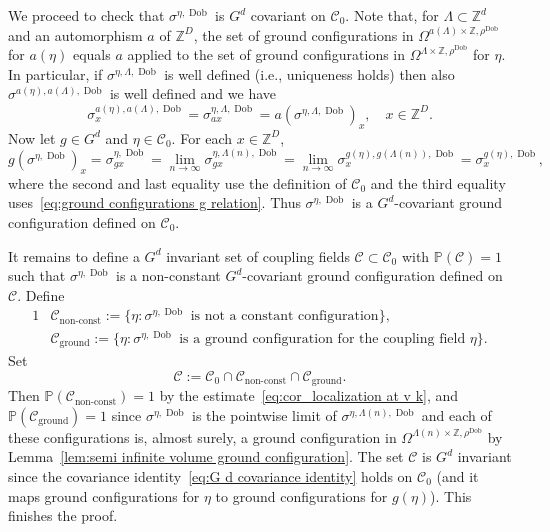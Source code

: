 \documentclass[11pt, reqno]{amsart}
\newcommand{\Z}{\mathbb{Z}}
\DeclareMathOperator{\Dob}{Dob}
\renewcommand{\P}{\mathbb{P}}
\numberwithin{equation}{section}
\begin{document}
We proceed to check that $\sigma^{\eta,\Dob}$ is $G^d$ covariant on $\mathcal{C}_0$. Note that, for $\Lambda\subset\Z^d$ and an automorphism $a$ of $\Z^D$, the set of ground configurations in $\Omega^{a(\Lambda)\times\Z,\rho^{\Dob}}$ for $a(\eta)$ equals $a$ applied to the set of ground configurations in $\Omega^{\Lambda\times\Z,\rho^{\Dob}}$ for $\eta$. In particular, if $\sigma^{\eta,\Lambda,\Dob}$ is well defined (i.e., uniqueness holds) then also $\sigma^{a(\eta),a(\Lambda),\Dob}$ is well defined and we have
\begin{equation}
\label{eq:ground configurations g relation}\sigma^{a(\eta),a(\Lambda),\Dob}_x=\sigma^{\eta,\Lambda,\Dob}_{a x} = a(\sigma^{\eta,\Lambda,\Dob})_x,\quad x\in\Z^D.
\end{equation} 
Now let $g\in G^d$ and $\eta\in\mathcal{C}_0$. For each $x\in\Z^D$,
\begin{equation}\label{eq:G d covariance identity}
g(\sigma^{\eta,\Dob})_x = \sigma^{\eta,\Dob}_{g x} = \lim_{n\to\infty}\sigma^{\eta,\Lambda(n),\Dob}_{g x}=\lim_{n\to\infty}\sigma^{g(\eta),g(\Lambda(n)),\Dob}_x = \sigma^{g(\eta),\Dob}_x,
\end{equation}
where the second and last equality use the definition of $\mathcal{C}_0$ and the third equality uses~\eqref{eq:ground configurations g relation}. Thus $\sigma^{\eta,\Dob}$ is a $G^d$-covariant ground configuration defined on $\mathcal{C}_0$.

It remains to define a $G^d$ invariant set of coupling fields $\mathcal{C}\subset\mathcal{C}_0$ with $\P(\mathcal{C})=1$ such that $\sigma^{\eta,\Dob}$ is a non-constant $G^d$-covariant ground configuration defined on $\mathcal{C}$. Define
\begin{alignat}{1}
&\mathcal{C}_{\text{non-const}}:=\{\eta\colon \sigma^{\eta,\Dob}\text{ is not a constant configuration}\},\\
&\mathcal{C}_{\text{ground}}:=\{\eta\colon\sigma^{\eta,\Dob}\text{ is a ground configuration for the coupling field $\eta$}\}.
\end{alignat}
Set
\begin{equation}
\mathcal{C} := \mathcal{C}_0\cap\mathcal{C}_{\text{non-const}}\cap \mathcal{C}_{\text{ground}}.
\end{equation}
Then $\P(\mathcal{C}_{\text{non-const}})=1$ by the estimate~\eqref{eq:cor_localization at v k}, and $\P(\mathcal{C}_{\text{ground}})=1$ since $\sigma^{\eta,\Dob}$ is the pointwise limit of $\sigma^{\eta,\Lambda(n),\Dob}$ and each of these configurations is, almost surely, a ground configuration in $\Omega^{\Lambda(n)\times\Z,\rho^{\Dob}}$ by Lemma~\ref{lem:semi infinite volume ground configuration}. The set $\mathcal{C}$ is $G^d$ invariant since the covariance identity~\eqref{eq:G d covariance identity} holds on $\mathcal{C}_0$ (and it maps ground configurations for $\eta$ to ground configurations for $g(\eta)$). This finishes the proof.
\end{document}
